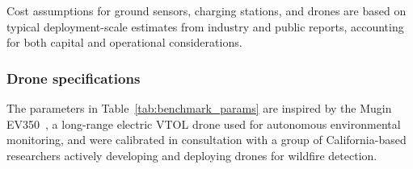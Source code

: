 \documentclass[pdflatex,sn-mathphys-num]{sn-jnl}%
\theoremstyle{thmstyleone}%
\theoremstyle{thmstyletwo}%
\theoremstyle{thmstylethree}%
\begin{document}
Cost assumptions for ground sensors, charging stations, and drones are based on typical deployment-scale estimates from industry and public reports, accounting for both capital and operational considerations.





\subsubsection*{Drone specifications}
The parameters in Table~\ref{tab:benchmark_params} are inspired by the Mugin EV350~\cite{mugin_ev350}, a long-range electric VTOL drone used for autonomous environmental monitoring, and were calibrated in consultation with a group of California-based researchers actively developing and deploying drones for wildfire detection.
\end{document}

